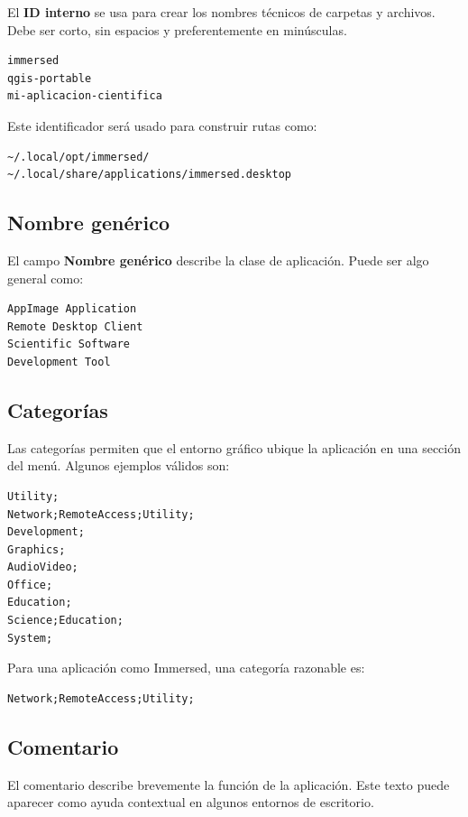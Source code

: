 \documentclass[11pt,a4paper]{article}
\begin{document}
El \textbf{ID interno} se usa para crear los nombres técnicos de carpetas y archivos. Debe ser corto, sin espacios y preferentemente en minúsculas.

\begin{lstlisting}[style=textstyle]
immersed
qgis-portable
mi-aplicacion-cientifica
\end{lstlisting}

Este identificador será usado para construir rutas como:

\begin{lstlisting}[style=textstyle]
~/.local/opt/immersed/
~/.local/share/applications/immersed.desktop
\end{lstlisting}

\subsection{Nombre genérico}

El campo \textbf{Nombre genérico} describe la clase de aplicación. Puede ser algo general como:

\begin{lstlisting}[style=textstyle]
AppImage Application
Remote Desktop Client
Scientific Software
Development Tool
\end{lstlisting}

\subsection{Categorías}

Las categorías permiten que el entorno gráfico ubique la aplicación en una sección del menú. Algunos ejemplos válidos son:

\begin{lstlisting}[style=textstyle]
Utility;
Network;RemoteAccess;Utility;
Development;
Graphics;
AudioVideo;
Office;
Education;
Science;Education;
System;
\end{lstlisting}

Para una aplicación como Immersed, una categoría razonable es:

\begin{lstlisting}[style=textstyle]
Network;RemoteAccess;Utility;
\end{lstlisting}

\subsection{Comentario}

El comentario describe brevemente la función de la aplicación. Este texto puede aparecer como ayuda contextual en algunos entornos de escritorio.
\end{document}
